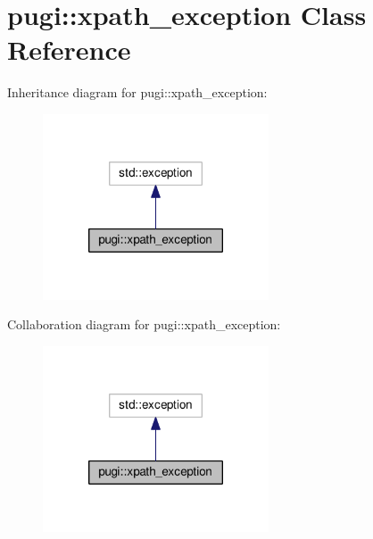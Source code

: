 \hypertarget{classpugi_1_1xpath__exception}{\section{pugi\+:\+:xpath\+\_\+exception Class Reference}
\label{classpugi_1_1xpath__exception}
}


Inheritance diagram for pugi\+:\+:xpath\+\_\+exception\+:
\nopagebreak
\begin{figure}[H]
\begin{center}
\leavevmode
\includegraphics[width=190pt]{classpugi_1_1xpath__exception__inherit__graph}
\end{center}
\end{figure}


Collaboration diagram for pugi\+:\+:xpath\+\_\+exception\+:
\nopagebreak
\begin{figure}[H]
\begin{center}
\leavevmode
\includegraphics[width=190pt]{classpugi_1_1xpath__exception__coll__graph}
\end{center}
\end{figure}
